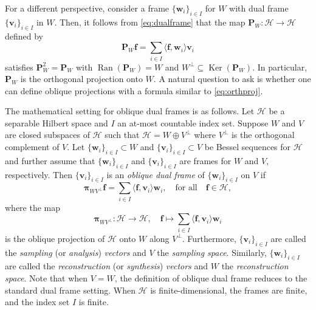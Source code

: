 \documentclass{amsart}
\numberwithin{equation}{section}
\DeclareMathOperator{\kernel}{Ker}
\DeclareMathOperator{\range}{Ran}
\newcommand{\bP}{{\mathbf P}}
\newcommand{\bpi}{{\boldsymbol{\pi}}}
\newcommand{\bof}{{\mathbf f}}
\newcommand{\cH}{{\mathcal H}}
\newcommand{\rar}{\rightarrow}
\theoremstyle{plain}
\theoremstyle{remark}
\theoremstyle{definition}
\begin{document}
For a different perspective, consider a frame $\{\mathbf{w}_i\}_{i \in I}$ for $W$ with dual frame $\{\mathbf{v}_i\}_{i \in I}$ in $W$.  Then, it follows from \cref{eq:dualframe} that the map $\bP_W: \cH \rar \cH$ defined by 
\begin{equation}\label{eq:orthproj}
 \bP_W \mathbf{f} = \sum_{i\in I} \langle \mathbf{f}, \mathbf{w}_i \rangle \mathbf{v}_i
\end{equation}
satisfies $\bP_W^2 = \bP_W$ with $\range(\bP_W) = W$ and $W^\perp \subseteq \kernel(\bP_W)$.  In particular, $\bP_W$ is the orthogonal projection onto $W$.  A natural question to ask is whether one can define oblique projections with a formula similar to \cref{eq:orthproj}.



The mathematical setting for oblique dual frames is as follows. Let $\cH$ be a separable Hilbert space and $I$ an at-most countable index set. Suppose $W$ and $V$ are closed subspaces of $\mathcal{H}$ such that $\mathcal{H} = W \oplus V^\perp$ where $V^\perp$ is the orthogonal complement of $V$. Let $\{\mathbf{w}_i\}_{i \in I} \subset W$ and $\{\mathbf{v}_i\}_{i \in I} \subset V$ be Bessel sequences for $\mathcal{H}$ and further assume that  $\{\mathbf{w}_i\}_{i \in I}$ and $\{\mathbf{v}_i\}_{i \in I}$ are frames for $W$ and $V$, respectively. 
Then $\{\mathbf{v}_i\}_{i \in I}$ is an \emph{oblique dual frame} of $\{\mathbf{w}_i\}_{i \in I}$ on $V$ if 
\begin{equation*}
   \bpi_{WV^\perp} \mathbf{f} = \sum_{i \in I} \langle \mathbf{f}, \mathbf{v}_i \rangle \mathbf{w}_i, \quad \text{for all} \quad \mathbf{f} \in \mathcal{H},
\end{equation*}
where the map 
\[
\bpi_{WV^\perp}: \cH \rar \cH, \quad \bof \mapsto \sum_{i \in I} \langle \mathbf{f}, \mathbf{v}_i \rangle \mathbf{w}_i
\]
is the oblique projection of $\cH$ onto $W$ along $V^\perp$.
Furthermore, $\{\mathbf{v}_i\}_{i \in I}$ are called the \emph{sampling} (or \emph{analysis}) \emph{vectors} and  $V$ the \emph{sampling space}. Similarly, $\{\mathbf{w}_i\}_{i \in I}$ are called the \emph{reconstruction} (or \emph{synthesis}) \emph{vectors} and $W$ the \emph{reconstruction space}. Note that when $V=W$, the definition of oblique dual frame reduces to the standard dual frame setting. When $\mathcal{H}$ is finite-dimensional, the frames are finite, and the index set $I$ is finite.
\end{document}
